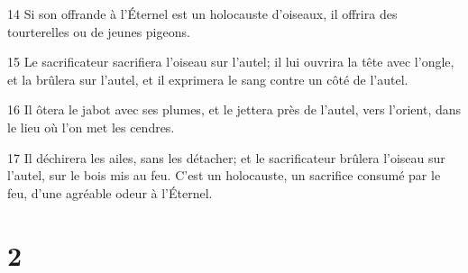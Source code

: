 \par 14 Si son offrande à l'Éternel est un holocauste d'oiseaux, il offrira des tourterelles ou de jeunes pigeons.
\par 15 Le sacrificateur sacrifiera l'oiseau sur l'autel; il lui ouvrira la tête avec l'ongle, et la brûlera sur l'autel, et il exprimera le sang contre un côté de l'autel.
\par 16 Il ôtera le jabot avec ses plumes, et le jettera près de l'autel, vers l'orient, dans le lieu où l'on met les cendres.
\par 17 Il déchirera les ailes, sans les détacher; et le sacrificateur brûlera l'oiseau sur l'autel, sur le bois mis au feu. C'est un holocauste, un sacrifice consumé par le feu, d'une agréable odeur à l'Éternel.

\chapter{2}

